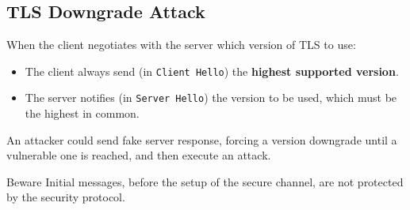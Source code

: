 \subsection{TLS Downgrade Attack}
When the client negotiates with the server which version of TLS to use: 
\begin{itemize}
    \item The client always send (in \texttt{Client Hello}) the \textbf{highest supported version}.
    \item The server notifies (in \texttt{Server Hello}) the version to be used, which must be the highest in common.
\end{itemize}
An attacker could send fake server response, forcing a version downgrade until a vulnerable one is reached, and then execute an attack. 
\begin{quotebox-red}{Beware}
Initial messages, before the setup of the secure channel, are not protected by the security protocol. 
\end{quotebox-red}



    

